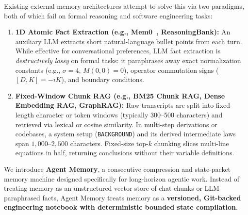 \documentclass[11pt,a4paper]{article}
\begin{document}
Existing external memory architectures attempt to solve this via two paradigms, both of which fail on formal reasoning and software engineering tasks:
\begin{enumerate}[leftmargin=1.5em]
    \item \textbf{1D Atomic Fact Extraction (e.g., Mem0~\cite{chhikara2025mem0}, ReasoningBank):} An auxiliary LLM extracts short natural-language bullet points from each turn. While effective for conversational preferences, LLM fact extraction is \emph{destructively lossy} on formal tasks: it paraphrases away exact normalization constants (e.g., $\sigma=4$, $M(0,0)=0$), operator commutation signs ($[D,K]=-iK$), and boundary conditions.
    \item \textbf{Fixed-Window Chunk RAG (e.g., BM25 Chunk RAG, Dense Embedding RAG, GraphRAG):} Raw transcripts are split into fixed-length character or token windows (typically 300--500 characters) and retrieved via lexical or cosine similarity. In multi-step derivations or codebases, a system setup (\texttt{BACKGROUND}) and its derived intermediate laws span $1{,}000$--$2{,}500$ characters. Fixed-size top-$k$ chunking slices multi-line equations in half, returning conclusions without their variable definitions.
\end{enumerate}

We introduce \textbf{Agent Memory}, a consecutive compression and state-packet memory machine designed specifically for long-horizon agentic work. Instead of treating memory as an unstructured vector store of chat chunks or LLM-paraphrased facts, Agent Memory treats memory as a \textbf{versioned, Git-backed engineering notebook with deterministic bounded state compilation}.
\end{document}
